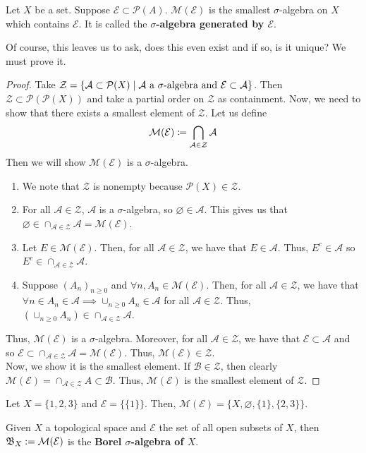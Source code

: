 \documentclass[11pt,leqno,oneside]{amsbook}
\numberwithin{thm}{section}
\renewcommand{\P}{\mathcal{P}} %
\renewcommand{\A}{\mathcal{A}} %
\newcommand{\M}{\mathcal{M}} %
\newcommand{\Ep}{\mathcal{E}} %
\newcommand{\s}{$\sigma$-} %
\renewcommand{\de}{\textbf} %
\begin{document}
\begin{defn}
  Let $X$ be a set. Suppose $\Ep \subset \P(A)$. $\M(\Ep)$ is the
  smallest \s algebra on $X$ which contains $\Ep$.  It is called the
  \de{\s algebra generated by $\Ep$}.
\end{defn}
Of course, this leaves us to ask, does this even exist and if so, is
it unique? We must prove it.
\begin{proof}
  Take $\mathcal{Z} = \{\A \subset \P(X) \st \A \text{ a }
  \sigma\text{-algebra and } \Ep \subset \A\}$. Then $\mathcal{Z}
  \subset \P(\P(X))$ and take a partial order on $\mathcal{Z}$ as
  containment. Now, we need to show that there exists a smallest
  element of $\mathcal{Z}$. Let us define \[
    \M(\Ep) \defeq \bigcap_{\A \in \mathcal{Z}} \A
  \]
  Then we will show $\M(\Ep)$ is a \s algebra.
  \begin{enumerate}
  \item We note that $\mathcal{Z}$ is nonempty because $\P(X) \in \mathcal{Z}$.
  \item For all $\A \in \mathcal{Z}$, $\A$ is a \s algebra, so
    $\varnothing \in \A$. This gives us that $\varnothing \in \cap_{\A
      \in \mathcal{Z}} \A = \M(\Ep)$.
  \item Let $E \in \M(\Ep)$. Then, for all $\A \in \mathcal{Z}$, we have that
    $E \in \A$. Thus, $E^c \in \A$ so $E^c \in \cap_{\A \in \mathcal{Z}} \A$.
  \item Suppose $(A_n)_{n \geq 0}$ and $\forall n, A_n \in
    \M(\Ep)$. Then, for all $\A \in \mathcal{Z}$, we have that $\forall n \in
    A_n \in \A \implies \cup_{n \geq 0} A_n \in \A$ for all $\A
    \in \mathcal{Z}$. Thus, $(\cup_{n \geq 0} A_n) \in \cap_{\A \in \mathcal{Z}} \A$.
  \end{enumerate}
  Thus, $\M(\Ep)$ is a \s algebra. Moreover, for all $\A \in
  \mathcal{Z}$, we have that $\Ep \subset \A$ and so $\Ep \subset \cap_{\A \in
    \mathcal{Z}} \A = \M(\Ep)$. Thus, $\M(\Ep) \in \mathcal{Z}$. \\

  Now, we show it is the smallest element. If $\mathscr{B} \in
  \mathcal{Z}$, then clearly $\M(\Ep) = \cap_{\A \in \mathcal{Z}} A
  \subset \mathscr{B}$. Thus, $\M(\Ep)$ is the smallest element of
  $\mathcal{Z}$.
\end{proof}
\begin{example}
  Let $X = \{1,2,3\}$ and $\Ep = \{\{1\}\}$. Then, $\M(\Ep) = \{X,
  \varnothing, \{1\},\{2,3\}\}$.
\end{example}
\begin{defn}
  Given $X$ a topological space and $\Ep$ the set of all open subsets of $X$,
  then $\B_X := \M(\Ep)$ is the \de{Borel \s algebra of $X$}.
\end{defn}
\end{document}
